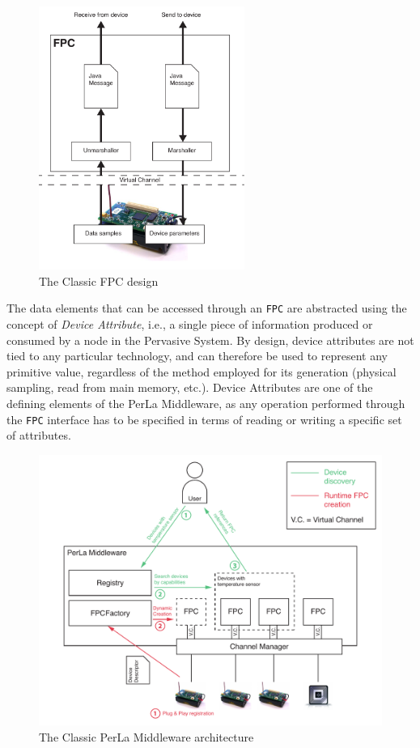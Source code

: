 \begin{figure}[h!]
\center
\includegraphics[width=0.6\textwidth]{imgs/classic_fpc.pdf}
\caption{The Classic FPC design}
\label{fig:classic_fpc}
\end{figure}

The data elements that can be accessed through an \texttt{FPC} are abstracted
using the concept of \textit{Device Attribute}, i.e., a single piece of
information produced or consumed by a node in the Pervasive System. By design,
device attributes are not tied to any particular technology, and can therefore
be used to represent any primitive value, regardless of the method employed for
its generation (physical sampling, read from main memory, etc.). Device
Attributes are one of the defining elements of the PerLa Middleware, as any
operation performed through the \texttt{FPC} interface has to be specified in
terms of reading or writing a specific set of attributes.

\begin{figure}[h!]
\includegraphics[width=\textwidth]{imgs/classic_middleware_overview.pdf}
\caption{The Classic PerLa Middleware architecture}
\label{fig:classic_architecture}
\end{figure}

